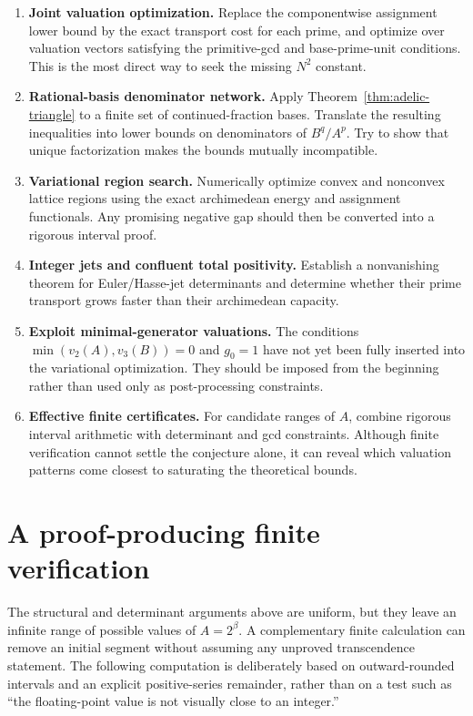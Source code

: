 \documentclass[11pt]{article}
\theoremstyle{definition}
\begin{document}
\begin{enumerate}
\item \textbf{Joint valuation optimization.}  Replace the componentwise
assignment lower bound by the exact transport cost for each prime, and optimize
over valuation vectors satisfying the primitive-gcd and base-prime-unit
conditions.  This is the most direct way to seek the missing $N^2$ constant.

\item \textbf{Rational-basis denominator network.}  Apply
Theorem~\ref{thm:adelic-triangle} to a finite set of continued-fraction bases.
Translate the resulting inequalities into lower bounds on denominators of
$B^q/A^p$.  Try to show that unique factorization makes the bounds mutually
incompatible.

\item \textbf{Variational region search.}  Numerically optimize convex and
nonconvex lattice regions using the exact archimedean energy and assignment
functionals.  Any promising negative gap should then be converted into a
rigorous interval proof.

\item \textbf{Integer jets and confluent total positivity.}  Establish a
nonvanishing theorem for Euler/Hasse-jet determinants and determine whether
their prime transport grows faster than their archimedean capacity.

\item \textbf{Exploit minimal-generator valuations.}  The conditions
$\min(v_2(A),v_3(B))=0$ and $g_0=1$ have not yet been fully inserted into the
variational optimization.  They should be imposed from the beginning rather
than used only as post-processing constraints.

\item \textbf{Effective finite certificates.}  For candidate ranges of $A$,
combine rigorous interval arithmetic with determinant and gcd constraints.
Although finite verification cannot settle the conjecture alone, it can reveal
which valuation patterns come closest to saturating the theoretical bounds.
\end{enumerate}


\section{A proof-producing finite verification}
\label{sec:finite-verification}

The structural and determinant arguments above are uniform, but they leave an
infinite range of possible values of $A=2^\beta$.  A complementary finite
calculation can remove an initial segment without assuming any unproved
transcendence statement.  The following computation is deliberately based on
outward-rounded intervals and an explicit positive-series remainder, rather
than on a test such as ``the floating-point value is not visually close to an
integer.''
\end{document}
